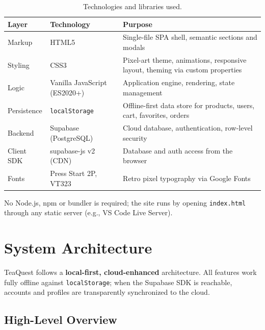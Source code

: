 \documentclass[11pt,a4paper]{article}
\begin{document}
\begin{table}[h!]
\centering
\caption{Technologies and libraries used.}
\begin{tabular}{@{}p{4.2cm}p{4.2cm}p{6.2cm}@{}}
\toprule
\textbf{Layer} & \textbf{Technology} & \textbf{Purpose} \\
\midrule
Markup       & HTML5                  & Single-file SPA shell, semantic sections and modals \\
Styling      & CSS3                   & Pixel-art theme, animations, responsive layout, theming via custom properties \\
Logic        & Vanilla JavaScript (ES2020+) & Application engine, rendering, state management \\
Persistence  & \texttt{localStorage}  & Offline-first data store for products, users, cart, favorites, orders \\
Backend      & Supabase (PostgreSQL)  & Cloud database, authentication, row-level security \\
Client SDK   & supabase-js v2 (CDN)   & Database and auth access from the browser \\
Fonts        & Press Start 2P, VT323  & Retro pixel typography via Google Fonts \\
\bottomrule
\end{tabular}
\end{table}

No Node.js, npm or bundler is required; the site runs by opening
\texttt{index.html} through any static server (e.g., VS Code Live Server).


\section{System Architecture}

TeaQuest follows a \textbf{local-first, cloud-enhanced} architecture. All
features work fully offline against \texttt{localStorage}; when the Supabase
SDK is reachable, accounts and profiles are transparently synchronized to
the cloud.

\subsection{High-Level Overview}
\end{document}
